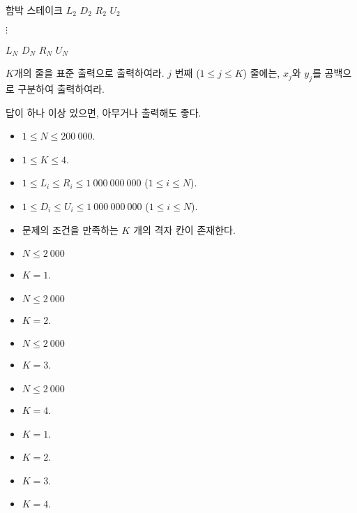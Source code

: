 \begin{problem}{함박 스테이크}
$L_2$ $D_2$ $R_2$ $U_2$

$\vdots$

$L_N$ $D_N$ $R_N$ $U_N$

\OutputFile

$K$개의 줄을 표준 출력으로 출력하여라. $j$ 번째 ($1 \le j \le K$) 줄에는, $x_j$와 $y_j$를 공백으로 구분하여 출력하여라.

답이 하나 이상 있으면, 아무거나 출력해도 좋다.

\Constraints

\begin{itemize}
	\item $1 \le N \le 200\ 000$.
	\item $1 \le K \le 4$.
	\item $1 \le L_i \le R_i \le 1\ 000\ 000\ 000$ ($1 \le i \le N$).
	\item $1 \le D_i \le U_i \le 1\ 000\ 000\ 000$ ($1 \le i \le N$).
	\item 문제의 조건을 만족하는 $K$ 개의 격자 칸이 존재한다.
\end{itemize}


\begin{itemize}
	\item $N \le 2\ 000$
	\item $K=1$.
\end{itemize}
\begin{itemize}
	\item $N \le 2\ 000$
	\item $K=2$.
\end{itemize}
\begin{itemize}
	\item $N \le 2\ 000$
	\item $K=3$.
\end{itemize}
\begin{itemize}
	\item $N \le 2\ 000$
	\item $K=4$.
\end{itemize}
\begin{itemize}
	\item $K=1$.
\end{itemize}
\begin{itemize}
	\item $K=2$.
\end{itemize}
\begin{itemize}
	\item $K=3$.
\end{itemize}
\begin{itemize}
	\item $K=4$.
\end{itemize}


\end{problem}
